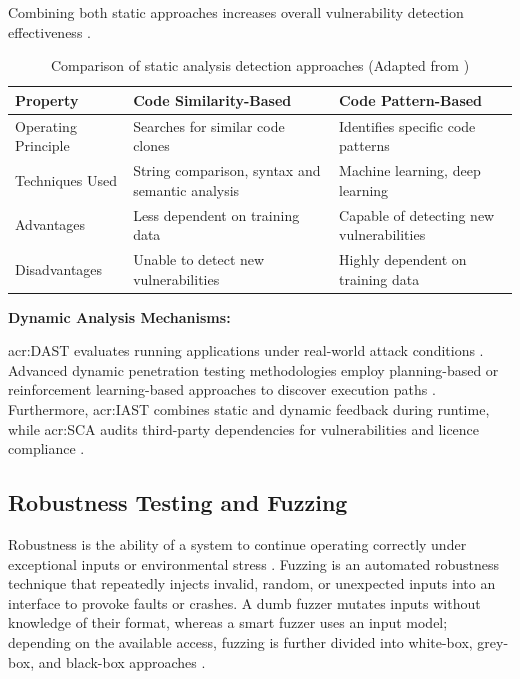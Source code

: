 Combining both static approaches increases overall vulnerability detection effectiveness \cite[p. 8]{cong2024overview}.
\begin{table}[H]
	\caption[Comparison of static analysis detection approaches]{Comparison of static analysis detection approaches (Adapted from \cite[p. 3, 8]{cong2024overview})}
	\label{tab:static_analysis_comparison}
	\centering
	\begin{tabularx}{\textwidth}{l X X}
		\toprule
		\textbf{Property} & \textbf{Code Similarity-Based} & \textbf{Code Pattern-Based} \\
		\midrule
		Operating Principle & Searches for similar code clones & Identifies specific code patterns \\ \addlinespace
		Techniques Used & String comparison, syntax and semantic analysis & Machine learning, deep learning \\ \addlinespace
		Advantages & Less dependent on training data & Capable of detecting new vulnerabilities \\ \addlinespace
		Disadvantages & Unable to detect new vulnerabilities & Highly dependent on training data \\
		\bottomrule
	\end{tabularx}
\end{table}
\textbf{Dynamic Analysis Mechanisms:} 

\gls{acr:DAST} evaluates running applications under real-world attack conditions \cite{GeeksforGeeksSecurityTesting}. Advanced dynamic penetration testing methodologies employ planning-based or reinforcement learning-based approaches to discover execution paths \cite[p. 6]{cong2024overview}. Furthermore, \gls{acr:IAST} combines static and dynamic feedback during runtime, while \gls{acr:SCA} audits third-party dependencies for vulnerabilities and licence compliance \cite{GeeksforGeeksSecurityTesting}.


\subsection{Robustness Testing and Fuzzing}
\label{subsec:robustness_fuzzing}

Robustness is the ability of a system to continue operating correctly under exceptional inputs or environmental stress \cite[p. 39]{richier2011security}. Fuzzing is an automated robustness technique that repeatedly injects invalid, random, or unexpected inputs into an interface to provoke faults or crashes. A dumb fuzzer mutates inputs without knowledge of their format, whereas a smart fuzzer uses an input model; depending on the available access, fuzzing is further divided into white-box, grey-box, and black-box approaches \cite[p. 8]{cong2024overview} \cite[p. 29]{richier2011security}. 

